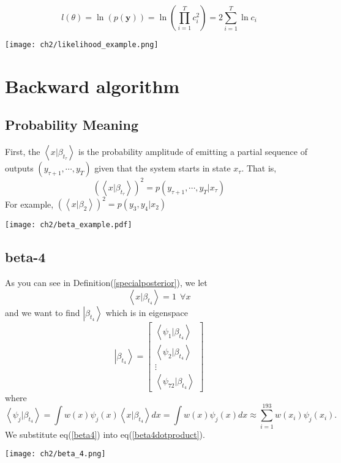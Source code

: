 \begin{definition}
\begin{equation}
        l(\theta) = \ln{(p(\textbf{y}))} = \ln{(\prod_{i=1}^{T} c_i^2)} = 2\sum_{i=1}^{T} \ln{c_i}  
\end{equation}
\begin{center}
        \texttt{[image: ch2/likelihood\_example.png]}
\end{center}
\end{definition}

\section{Backward algorithm}
\subsection{Probability Meaning}
First, the $ \left<x|\beta_{t_{\tau}} \right>$ is the probability amplitude of emitting a partial sequence of outputs $(y_{\tau+1},\cdots,y_{T})$ given that the system starts in state $x_{\tau}$. That is,
\begin{equation}
        (\left<x|\beta_{t_{\tau}} \right>)^2 = p(y_{\tau+1},\cdots,y_{T}|x_{\tau})
\end{equation}
For example, $(\left<x|\beta_{2} \right>)^2 = p(y_3, y_4|x_2)$
\begin{center}
        \texttt{[image: ch2/beta\_example.pdf]}
\end{center}

\subsection{beta-4}
\begin{definition}
As you can see in Definition(\ref{specialposterior}), we let
\begin{equation}\label{beta4}
        \left<x|\beta_{t_4} \right>=1~~\forall x 
\end{equation}
and we want to find $\left|\beta_{t_4} \right> $ which is in eigenspace
\begin{equation}
        \left|\beta_{t_4} \right> = \begin{bmatrix}
                \left< \psi_1|\beta_{t_4} \right> \\ \left< \psi_2|\beta_{t_4} \right> \\ \vdots \\ 
                \left< \psi_{72}|\beta_{t_4} \right>
        \end{bmatrix} 
\end{equation}
where
\begin{equation}\label{beta4dotproduct}
        \left< \psi_j | \beta_{t_4} \right> = \int w(x) \psi_j(x)  \left<x|\beta_{t_4} \right> dx
        = \int w(x) \psi_j(x) dx \approx \sum_{i=1}^{193} w(x_i) \psi_j(x_i).
\end{equation}
We substitute eq(\ref{beta4}) into eq(\ref{beta4dotproduct}).
\begin{center}
        \texttt{[image: ch2/beta\_4.png]}
\end{center}
\end{definition}

